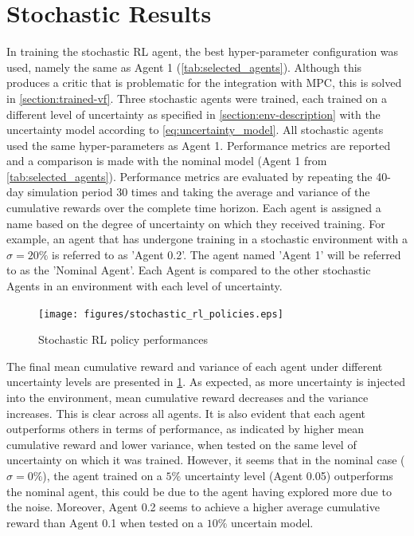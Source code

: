 \section{Stochastic Results}
In training the stochastic RL agent, the best hyper-parameter configuration was used, namely the same as Agent 1 (\autoref{tab:selected_agents}). Although this produces a critic that is problematic for the integration with MPC, this is solved in \autoref{section:trained-vf}. Three stochastic agents were trained, each trained on a different level of uncertainty as specified in \autoref{section:env-description} with the uncertainty model according to \autoref{eq:uncertainty_model}. All stochastic agents used the same hyper-parameters as Agent 1. Performance metrics are reported and a comparison is made with the nominal model (Agent 1 from \autoref{tab:selected_agents}). Performance metrics are evaluated by repeating the 40-day simulation period 30 times and taking the average and variance of the cumulative rewards over the complete time horizon.
Each agent is assigned a name based on the degree of uncertainty on which they received training. For example, an agent that has undergone training in a stochastic environment with a $\sigma = 20\%$ is referred to as 'Agent 0.2'. The agent named 'Agent 1' will be referred to as the 'Nominal Agent'. Each Agent is compared to the other stochastic Agents in an environment with each level of uncertainty.

\begin{figure}[H]
    \centering
    \texttt{[image: figures/stochastic\_rl\_policies.eps]}
    \caption{Stochastic RL policy performances}
    \label{fig:stochastic-rl-policies}
\end{figure}

The final mean cumulative reward and variance of each agent under different uncertainty levels are presented in \ref{fig:stochastic-rl-policies}. As expected, as more uncertainty is injected into the environment, mean cumulative reward decreases and the variance increases. This is clear across all agents. It is also evident that each agent outperforms others in terms of performance, as indicated by higher mean cumulative reward and lower variance,  when tested on the same level of uncertainty on which it was trained. However, it seems that in the nominal case ($\sigma = 0\%$), the agent trained on a $5\%$ uncertainty level (Agent 0.05) outperforms the nominal agent, this could be due to the agent having explored more due to the noise. Moreover, Agent 0.2 seems to achieve a higher average cumulative reward than Agent 0.1 when tested on a $10\%$ uncertain model.


